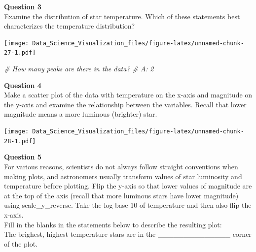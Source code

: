 \documentclass[
]{article}
\newenvironment{Shaded}{\begin{snugshade}}{\end{snugshade}}
\newcommand{\CommentTok}[1]{\textcolor[rgb]{0.56,0.35,0.01}{\textit{#1}}}
\newcommand{\DataTypeTok}[1]{\textcolor[rgb]{0.13,0.29,0.53}{#1}}
\newcommand{\KeywordTok}[1]{\textcolor[rgb]{0.13,0.29,0.53}{\textbf{#1}}}
\newcommand{\NormalTok}[1]{#1}
\newcommand{\OperatorTok}[1]{\textcolor[rgb]{0.81,0.36,0.00}{\textbf{#1}}}
\newcommand{\StringTok}[1]{\textcolor[rgb]{0.31,0.60,0.02}{#1}}
\begin{document}
\textbf{Question 3}\\
Examine the distribution of star temperature. Which of these statements
best characterizes the temperature distribution?

\begin{Shaded}
\end{Shaded}

\texttt{[image: Data\_Science\_Visualization\_files/figure-latex/unnamed-chunk-27-1.pdf]}

\begin{Shaded}
\begin{Highlighting}[]
\CommentTok{# How many peaks are there in the data?}
\CommentTok{# A: 2}
\end{Highlighting}
\end{Shaded}

\textbf{Question 4}\\
Make a scatter plot of the data with temperature on the x-axis and
magnitude on the y-axis and examine the relationship between the
variables. Recall that lower magnitude means a more luminous (brighter)
star.

\begin{Shaded}
\end{Shaded}

\texttt{[image: Data\_Science\_Visualization\_files/figure-latex/unnamed-chunk-28-1.pdf]}

\textbf{Question 5}\\
For various reasons, scientists do not always follow straight
conventions when making plots, and astronomers usually transform values
of star luminosity and temperature before plotting. Flip the y-axis so
that lower values of magnitude are at the top of the axis (recall that
more luminous stars have lower magnitude) using scale\_y\_reverse. Take
the log base 10 of temperature and then also flip the x-axis.\\
Fill in the blanks in the statements below to describe the resulting
plot:\\
The brighest, highest temperature stars are in the
\_\_\_\_\_\_\_\_\_\_\_\_\_\_ corner of the plot.
\end{document}
